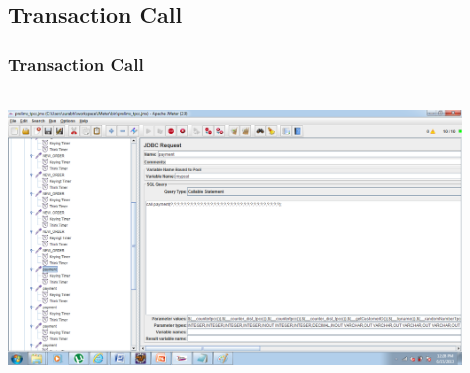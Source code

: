 \documentclass[12pt]{beamer}
\begin{document}
\subsection{Transaction Call}
\begin{frame}[c]
\frametitle{Transaction Call}
\centering
   \includegraphics[width=12cm, height=7.7cm]{images/procedurecall}

\end{frame}

\end{document}

